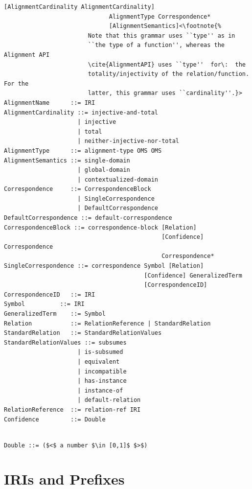 \documentclass[10pt,fleqn,final]{scrreprt}
\newcommand{\sclause}[1]{\section{#1}}
\newenvironment{definitions}[0]{\medskip }{}
\begin{document}
\begin{definitions}
\begin{lstlisting}[language=ebnf,escapeinside={<>},mathescape]
                              [AlignmentCardinality AlignmentCardinality]
                              AlignmentType Correspondence*
                              [AlignmentSemantics]<\footnote{%
                        Note that this grammar uses ``type'' as in
                        ``the type of a function'', whereas the Alignment API
                        \cite{AlignmentAPI} uses ``type''  for\:  the
                        totality/injectivity of the relation/function.  For the
                        latter, this grammar uses ``cardinality''.}>
AlignmentName      ::= IRI
AlignmentCardinality ::= injective-and-total
                     | injective
                     | total
                     | neither-injective-nor-total
AlignmentType      ::= alignment-type OMS OMS
AlignmentSemantics ::= single-domain
                     | global-domain
                     | contextualized-domain
Correspondence     ::= CorrespondenceBlock
                     | SingleCorrespondence
                     | DefaultCorrespondence
DefaultCorrespondence ::= default-correspondence
CorrespondenceBlock ::= correspondence-block [Relation]
                                             [Confidence] Correspondence
                                             Correspondence*
SingleCorrespondence ::= correspondence Symbol [Relation]
                                        [Confidence] GeneralizedTerm
                                        [CorrespondenceID]
CorrespondenceID   ::= IRI
Symbol          ::= IRI
GeneralizedTerm    ::= Symbol
Relation           ::= RelationReference | StandardRelation
StandardRelation   ::= StandardRelationValues
StandardRelationValues ::= subsumes
                     | is-subsumed
                     | equivalent
                     | incompatible
                     | has-instance
                     | instance-of
                     | default-relation
RelationReference  ::= relation-ref IRI
Confidence         ::= Double
\end{lstlisting}

\begin{lstlisting}[language=ebnf,escapeinside={()},mathescape]  % abstract syntax

Double ::= ($<$ a number $\in [0,1]$ $>$) 
\end{lstlisting}





\sclause{IRIs and Prefixes}

\begin{lstlisting}[language=ebnf,escapeinside={()}]  % abstract syntax


\end{lstlisting}
\end{definitions}
\end{document}
